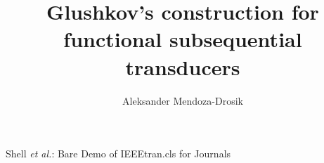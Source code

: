 \documentclass[journal]{journal}
\begin{document}
	\title{Glushkov's construction for functional subsequential transducers}
	
	\author{Aleksander Mendoza-Drosik}
	
	
	\newtheorem{theorem}{Theorem}
	\newtheorem{definition}{Definition}
	
	
	
	{Shell \MakeLowercase{\textit{et al.}}: Bare Demo of IEEEtran.cls for Journals}
	
	
	
	
	
\end{document}
